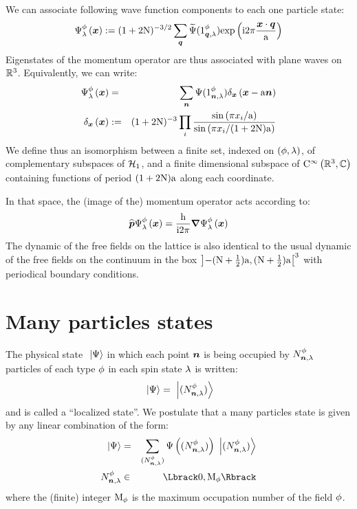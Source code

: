 \documentclass[10pt,a4paper,twoside,openany]{book}
\begin{document}
 We can associate following wave function components to each one particle state:
\begin{equation*}
\wf \Psi \pt \sp {\sv x} \eqdef (1+2 \N)^{-3/2} \sum_{\q} \FT\Psi(\bQ 1 \pt \q \sp) \exp{\i 2 \pi \frac{\sv x \ssp \q}{\a}}
\end{equation*}
Eigenstates of the momentum operator are thus associated with plane waves on $\IR^3$. Equivalently, we can write:
\begin{eqnarray*}
\wf \Psi \pt \sp {\sv x} & = & \sum_{\n} \Psi(\bX 1 \pt \n \sp) \deltaX{\sv x - \a \n} \\
\deltaX{\sv x} & \eqdef & (1+2 \N)^{-3} \prod_i \frac{\sin{\pi \svc x i / \a}}{\sin{\pi \svc x i / (1+2 \N)\a}}
\end{eqnarray*}
We define thus an isomorphism between a finite set, indexed on $( \pt,\sp )$, of complementary subspaces of $\Hn 1$, and a finite dimensional subspace of $\mathrm C^\infty\left(\IR^3,\IC\right)$ containing functions of period $(1+2\N)\a$ along each coordinate.

 In that space, the (image of the) momentum operator acts according to:
\begin{equation*}
\Pop \wf \Psi \pt \sp {\sv x} = \frac{\h}{\i 2 \pi} \sv \nabla \wf \Psi \pt \sp {\sv x}
\end{equation*}
The dynamic of the free fields on the lattice is also identical to the usual dynamic of the free fields on the continuum in the box $\left]-(\N+\frac 1 2)\a,(\N+\frac 1 2)\a\right[^3$ with periodical boundary conditions.

\section{Many particles states}
\label{Many particles states}

The physical state $\ket{\Psi}$ in which each point $\n$ is being occupied by $\bX N \pt \n \sp$ particles of each type $\pt$ in each spin state $\sp$ is written:
\begin{equation*}
\ket{\Psi} = \ketFX N \pt \n \sp
\end{equation*}
and is called a ``localized state''. We postulate that a many particles state is given by any linear combination of the form:
\begin{eqnarray*}
\ket{\Psi} & = & \sum_{\bFX N \pt \n \sp} \Psi \left(\bFX N \pt \n \sp \right) \ketFX N \pt \n \sp \\
\bX N \pt \n \sp & \in & \IntRange{0}{\M \pt}
\end{eqnarray*}
where the (finite) integer $\M \pt$ is the maximum occupation number of the field $\pt$.
\end{document}

